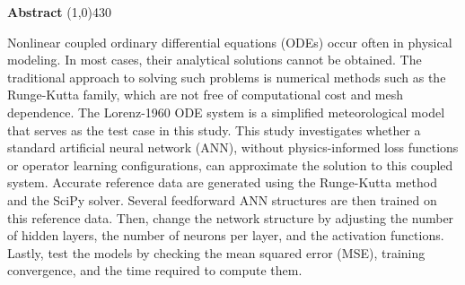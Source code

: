 \setlength{\headheight}{14pt}
\begin{center}
	{\huge \bf Abstract}
	\line(1,0){430}
\end{center}
Nonlinear coupled ordinary differential equations (ODEs) occur often in physical modeling. In most cases, their analytical solutions cannot be obtained. The traditional approach to solving such problems is numerical methods such as the Runge-Kutta family, which are not free of computational cost and mesh dependence. The Lorenz-1960 ODE system is a simplified meteorological model that serves as the test case in this study. This study investigates whether a standard artificial neural network (ANN), without physics-informed loss functions or operator learning configurations, can approximate the solution to this coupled system. Accurate reference data are generated using the Runge-Kutta method and the SciPy solver. Several feedforward ANN structures are then trained on this reference data. Then, change the network structure by adjusting the number of hidden layers, the number of neurons per layer, and the activation functions. Lastly, test the models by checking the mean squared error (MSE), training convergence, and the time required to compute them.

\clearpage
\setlength{\headheight}{12pt}